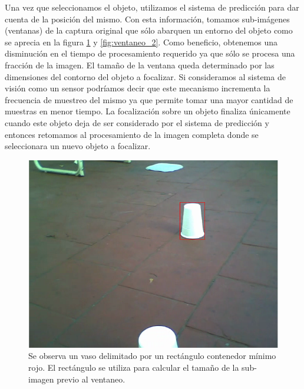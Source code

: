 	\indent Una vez que seleccionamos el objeto, utilizamos el sistema de 
	predicci\'on para dar cuenta de la posici\'on del mismo. Con esta 
	informaci\'on, tomamos sub-im\'agenes (ventanas) de la captura original 
	que s\'olo abarquen un entorno del objeto como se aprecia en la figura 
	\ref{fig:ventaneo} y \ref{fig:ventaneo_2}. Como beneficio, 
	obtenemos una 
	disminuci\'on en el tiempo de procesamiento requerido ya que s\'olo se procesa una fracci\'on de 
	la imagen. El tama\~no de la ventana queda determinado por 
	las dimensiones del contorno del objeto a focalizar. Si consideramos 
	al sistema de visi\'on como un sensor podr\'iamos decir que este 
	mecanismo incrementa la frecuencia de muestreo del mismo ya que 
	permite tomar una mayor cantidad de muestras en menor tiempo. La 
	focalizaci\'on sobre un objeto finaliza \'unicamente cuando este objeto 
	deja de ser considerado por el sistema de predicci\'on y entonces 
	retomamos al  procesamiento de la imagen completa donde se 
	seleccionara un nuevo objeto a focalizar. 

\begin{figure}[htpb]
\begin{center}
  \includegraphics[scale=0.55]{vision/figures/ventana-1.png}
\end{center}
  \caption[Ventaneo]{\small Se observa un vaso delimitado por un rect\'angulo 
  contenedor m\'inimo rojo. El rect\'angulo se utiliza para calcular el 
  tama\~no de la sub-imagen previo al ventaneo.}
  \label{fig:ventaneo}
\end{figure}


